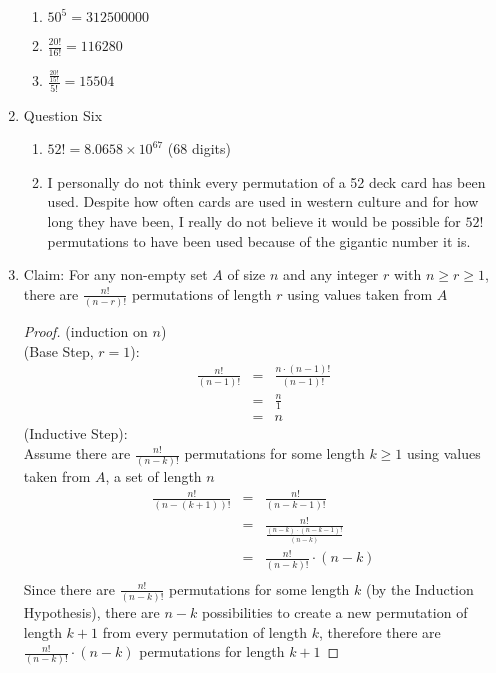 \documentclass{article}
\begin{document}
\begin{enumerate}
\begin{enumerate}
        \item $50^5 = 312500000$
        \item $\frac{20!}{16!} = 116280$
        \item $\frac{\frac{20!}{15!}}{5!} = 15504$
    \end{enumerate}
    \item Question Six
    \begin{enumerate}
        \item $52! = 8.0658 \times 10^{67}$ ($68$ digits)
        \item I personally do not think every permutation of a 52 deck card has been used. Despite how often cards are used in western culture and for how long they have been, I really do not believe it would be possible for $52!$ permutations to have been used because of the gigantic number it is.
    \end{enumerate}
    \item Claim: For any non-empty set $A$ of size $n$ and any integer $r$ with $n \geq r \geq 1$, there are $\frac{n!}{(n-r)!}$ permutations of length $r$ using values taken from $A$
    \begin{proof}
        (induction on $n$) \\
        (Base Step, $r=1$):
        \begin{eqnarray}
            \frac{n!}{(n-1)!} &=& \frac{n \cdot (n-1)!}{(n-1)!} \\
            &=& \frac{n}{1} \\
            &=& n
        \end{eqnarray}
        (Inductive Step): \\
        Assume there are $\frac{n!}{(n-k)!}$ permutations for some length $k \geq 1$ using values taken from $A$, a set of length $n$
        \begin{eqnarray}
            \frac{n!}{(n-(k+1))!} &=& \frac{n!}{(n-k-1)!} \\
            &=& \frac{n!}{\frac{(n-k) \cdot (n-k-1)!}{(n-k)}} \\
            &=& \frac{n!}{(n-k)!} \cdot (n-k) \\
        \end{eqnarray}
        Since there are $\frac{n!}{(n-k)!}$ permutations for some length $k$ (by the Induction Hypothesis), there are $n-k$ possibilities to create a new permutation of length $k+1$ from every permutation of length $k$, therefore there are $\frac{n!}{(n-k)!} \cdot (n-k)$ permutations for length $k+1$
    \end{proof}
\end{enumerate}
\end{document}
